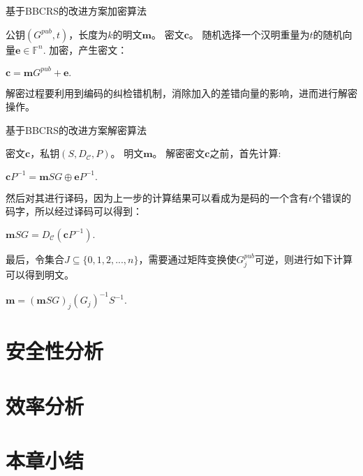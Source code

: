 \begin{breakablealgorithm}
	\small
	\renewcommand{\algorithmicrequire}{\textbf{Input:}}
	\renewcommand{\algorithmicensure}{\textbf{Output:}}
	\caption{基于BBCRS的改进方案加密算法}
	\label{alg:NeweEn}
	\begin{algorithmic}[1]
		\Require
		公钥$(G^{pub},t)$，长度为$k$的明文$\mathbf{m}$。
		\Ensure
		密文$\mathbf{c}$。
		\State
		随机选择一个汉明重量为$t$的随机向量$\mathbf{e} \in \mathbb{F}^n$.
		\State
		加密，产生密文：
		
		\centering $\mathbf{c} = \mathbf{m}G^{pub} + \mathbf{e}.$
	\end{algorithmic}
\end{breakablealgorithm}

解密过程要利用到编码的纠检错机制，消除加入的差错向量的影响，进而进行解密操作。

\begin{breakablealgorithm}
	\small
	\renewcommand{\algorithmicrequire}{\textbf{Input:}}
	\renewcommand{\algorithmicensure}{\textbf{Output:}}
	\caption{基于BBCRS的改进方案解密算法}
	\label{alg:NewDe}
	\begin{algorithmic}[1]
		\Require
		密文$\mathbf{c}$，私钥$(S,D_\mathcal{C},P)$。
		\Ensure
		明文$\mathbf{m}$。
		\State
		解密密文$\mathbf{c}$之前，首先计算:
		\begin{center}
			$\mathbf{c}P^{-1} = \mathbf{m}SG \oplus\textbf{e}P^{-1}.$
		\end{center}
		
		\State
		然后对其进行译码，因为上一步的计算结果可以看成为是码的一个含有$t$个错误的码字，所以经过译码可以得到：
		\begin{center}
			$\mathbf{m}SG = D_\mathcal{C}(\mathbf{c}P^{-1}).$
		\end{center}
		
		\State
		最后，令集合$J \subseteq \{0,1,2,...,n\}$，需要通过矩阵变换使$G_j^{pub}$可逆，则进行如下计算可以得到明文。
		\begin{center}
			$\mathbf{m} = (\mathbf{m}SG)_j(G_j)^{-1}S^{-1}.$
		\end{center}		
	\end{algorithmic}
\end{breakablealgorithm}

\section{安全性分析}


\section{效率分析}


\section{本章小结}
